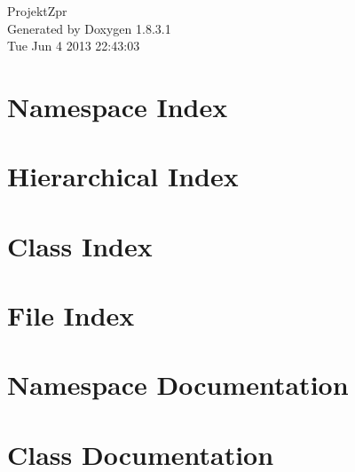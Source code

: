 \documentclass{book}
\begin{document}
\begin{titlepage}
\vspace*{7cm}
\begin{center}
{\Large Projekt\-Zpr }\\
\vspace*{1cm}
{\large Generated by Doxygen 1.8.3.1}\\
\vspace*{0.5cm}
{\small Tue Jun 4 2013 22:43:03}\\
\end{center}
\end{titlepage}
\clearemptydoublepage
{}
\tableofcontents
\clearemptydoublepage
{}
\chapter{Namespace Index}

\chapter{Hierarchical Index}

\chapter{Class Index}

\chapter{File Index}

\chapter{Namespace Documentation}

\chapter{Class Documentation}































\end{document}
